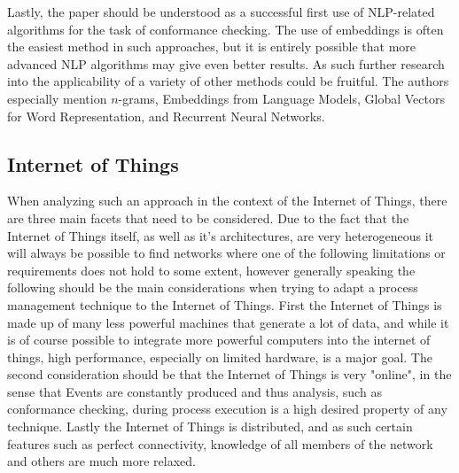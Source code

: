 \documentclass[runningheads]{template/llncs}
\begin{document}
Lastly, the paper should be understood as a successful first use of NLP-related algorithms for the task of conformance checking.
The use of embeddings is often the easiest method in such approaches, but it is entirely possible that more advanced NLP algorithms may give even better results.
As such further research into the applicability of a variety of other methods could be fruitful.
The authors especially mention $n$-grams, Embeddings from Language Models, Global Vectors for Word Representation, and Recurrent Neural Networks.

\color{red}
\subsection{Internet of Things}
When analyzing such an approach in the context of the Internet of Things, there are three main facets that need to be considered.
Due to the fact that the Internet of Things itself, as well as it's architectures, are very heterogeneous it will always be possible to find networks where one of the following limitations or requirements does not hold to some extent, however generally speaking the following should be the main considerations when trying to adapt a process management technique to the Internet of Things.
First the Internet of Things is made up of many less powerful machines that generate a lot of data, and while it is of course possible to integrate more powerful computers into the internet of things, high performance, especially on limited hardware, is a major goal.
The second consideration should be that the Internet of Things is very "online", in the sense that Events are constantly produced and thus analysis, such as conformance checking, during process execution is a high desired property of any technique. 
Lastly the Internet of Things is distributed, and as such certain features such as perfect connectivity, knowledge of all members of the network and others are much more relaxed.
\end{document}
